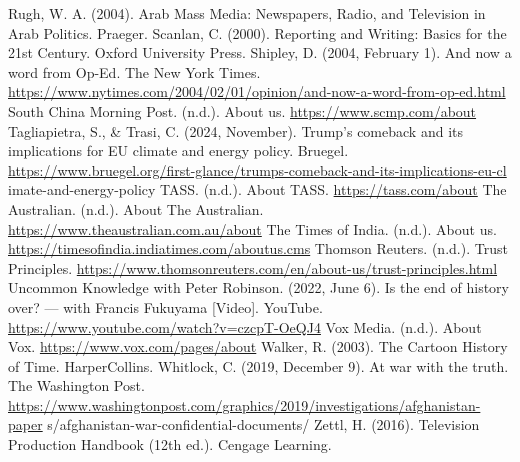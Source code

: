 \begin{referencelist}
   Rugh, W. A. (2004). Arab Mass Media: Newspapers, Radio, and Television in Arab Politics. Praeger.
   Scanlan, C. (2000). Reporting and Writing: Basics for the 21st Century. Oxford University Press.
   Shipley, D. (2004, February 1). And now a word from Op-Ed. The New York Times. \url{https://www.nytimes.com/2004/02/01/opinion/and-now-a-word-from-op-ed.html}
   South China Morning Post. (n.d.). About us. \url{https://www.scmp.com/about}
   Tagliapietra, S., \& Trasi, C. (2024, November). Trump's comeback and its implications for EU climate and energy policy. Bruegel. \url{https://www.bruegel.org/first-glance/trumps-comeback-and-its-implications-eu-cl} imate-and-energy-policy
   TASS. (n.d.). About TASS. \url{https://tass.com/about}
   The Australian. (n.d.). About The Australian. \url{https://www.theaustralian.com.au/about}
   The Times of India. (n.d.). About us. \url{https://timesofindia.indiatimes.com/aboutus.cms}
   Thomson Reuters. (n.d.). Trust Principles. \url{https://www.thomsonreuters.com/en/about-us/trust-principles.html}
   Uncommon Knowledge with Peter Robinson. (2022, June 6). Is the end of history over? — with Francis Fukuyama [Video]. YouTube. \url{https://www.youtube.com/watch?v=czcpT-OeQJ4}
   Vox Media. (n.d.). About Vox. \url{https://www.vox.com/pages/about}
   Walker, R. (2003). The Cartoon History of Time. HarperCollins.
   Whitlock, C. (2019, December 9). At war with the truth. The Washington Post. \url{https://www.washingtonpost.com/graphics/2019/investigations/afghanistan-paper} s/afghanistan-war-confidential-documents/
   Zettl, H. (2016). Television Production Handbook (12th ed.). Cengage Learning.
\end{referencelist}
